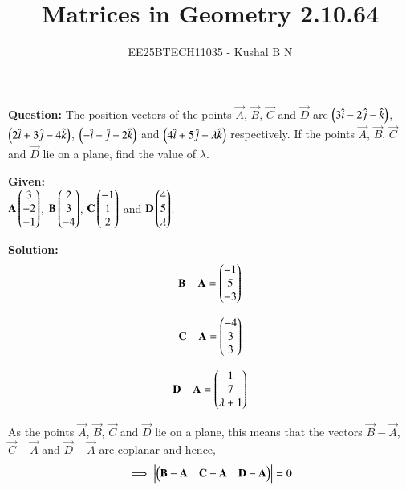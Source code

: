 \documentclass[journal,12pt,onecolumn]{IEEEtran}
\title{Matrices in Geometry 2.10.64}
\author{EE25BTECH11035 - Kushal B N}
\theoremstyle{remark}
\begin{document}
\vspace{3cm}
\maketitle
{\let\newpage\relax\maketitle}
\textbf{Question: }
The position vectors of the points $\vec{A}$, $\vec{B}$, $\vec{C}$ and $\vec{D}$ are $\left(3\hat{i}-2\hat{j}-\hat{k}\right)$, $\left(2\hat{i}+3\hat{j}-4\hat{k}\right)$, $\left(-\hat{i}+\hat{j}+2\hat{k}\right)$ and $\left(4\hat{i}+5\hat{j}+\lambda\hat{k}\right)$ respectively. If the points $\vec{A}$, $\vec{B}$, $\vec{C}$ and $\vec{D}$ lie on a plane, find the value of $\lambda$.
\bigskip

\textbf{Given: } \\
$\mathbf{A}\begin{pmatrix}3\\-2\\-1\end{pmatrix}$, $\mathbf{B}\begin{pmatrix}2\\3\\-4\end{pmatrix}$, $\mathbf{C}\begin{pmatrix}-1\\1\\2\end{pmatrix}$ and $\mathbf{D}\begin{pmatrix}4\\5\\\lambda\end{pmatrix}$.
\bigskip

\textbf{Solution: }\\
\begin{equation}
\mathbf{B} - \mathbf{A} = \begin{pmatrix}-1\\5\\-3\end{pmatrix}
\end{equation}

\begin{equation}
\mathbf{C} - \mathbf{A} = \begin{pmatrix}-4\\3\\3\end{pmatrix}
\end{equation}

\begin{equation}
\mathbf{D} - \mathbf{A} = \begin{pmatrix}1\\7\\\lambda+1\end{pmatrix}
\end{equation}

As the points $\vec{A}$, $\vec{B}$, $\vec{C}$ and $\vec{D}$ lie on a plane, this means that the vectors $\vec{B} - \vec{A}$, $\vec{C} - \vec{A}$ and $\vec{D} - \vec{A}$ are coplanar and hence,\\
\begin{equation}
\implies \left\vert\begin{pmatrix}\mathbf{B} - \mathbf{A} & \mathbf{C} - \mathbf{A} & \mathbf{D} - \mathbf{A}\end{pmatrix}\right\vert = 0
\end{equation}
\end{document}
